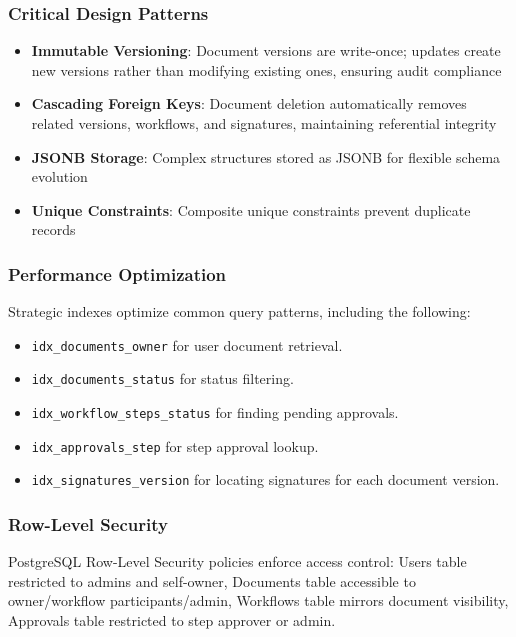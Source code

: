 \documentclass[12pt,oneside,openright,a4paper]{cpe-english-project}
\begin{document}
\subsubsection{Critical Design Patterns}

\begin{itemize}
    \item \textbf{Immutable Versioning}: Document versions are write-once; updates create new versions rather than modifying existing ones, ensuring audit compliance
    \item \textbf{Cascading Foreign Keys}: Document deletion automatically removes related versions, workflows, and signatures, maintaining referential integrity
    \item \textbf{JSONB Storage}: Complex structures stored as JSONB for flexible schema evolution
    \item \textbf{Unique Constraints}: Composite unique constraints prevent duplicate records
\end{itemize}

\subsubsection{Performance Optimization}

Strategic indexes optimize common query patterns, including the following:

\begin{itemize}
  \item \texttt{idx\_documents\_owner} for user document retrieval.
  \item \texttt{idx\_documents\_status} for status filtering.
  \item \texttt{idx\_workflow\_steps\_status} for finding pending approvals.
  \item \texttt{idx\_approvals\_step} for step approval lookup.
  \item \texttt{idx\_signatures\_version} for locating signatures for each document version.
\end{itemize}

\subsubsection{Row-Level Security}

PostgreSQL Row-Level Security policies enforce access control: Users table restricted to admins and self-owner, Documents table accessible to owner/workflow participants/admin, Workflows table mirrors document visibility, Approvals table restricted to step approver or admin.
\end{document}
